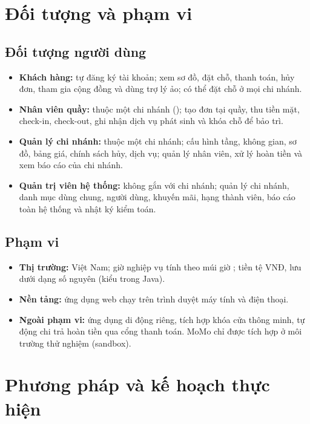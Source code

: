 \section{Đối tượng và phạm vi}
\label{sec:phamvi}

\subsection{Đối tượng người dùng}
\begin{itemize}
    \item \textbf{Khách hàng:} tự đăng ký tài khoản; xem sơ đồ, đặt chỗ, thanh toán, hủy đơn, tham gia cộng đồng và dùng trợ lý ảo; có thể đặt chỗ ở mọi chi nhánh.
    \item \textbf{Nhân viên quầy:} thuộc một chi nhánh (); tạo đơn tại quầy, thu tiền mặt, check-in, check-out, ghi nhận dịch vụ phát sinh và khóa chỗ để bảo trì.
    \item \textbf{Quản lý chi nhánh:} thuộc một chi nhánh; cấu hình tầng, không gian, sơ đồ, bảng giá, chính sách hủy, dịch vụ; quản lý nhân viên, xử lý hoàn tiền và xem báo cáo của chi nhánh.
    \item \textbf{Quản trị viên hệ thống:} không gắn với chi nhánh; quản lý chi nhánh, danh mục dùng chung, người dùng, khuyến mãi, hạng thành viên, báo cáo toàn hệ thống và nhật ký kiểm toán.
\end{itemize}

\subsection{Phạm vi}
\begin{itemize}
    \item \textbf{Thị trường:} Việt Nam; giờ nghiệp vụ tính theo múi giờ ; tiền tệ VNĐ, lưu dưới dạng số nguyên (kiểu  trong Java).
    \item \textbf{Nền tảng:} ứng dụng web chạy trên trình duyệt máy tính và điện thoại.
    \item \textbf{Ngoài phạm vi:} ứng dụng di động riêng, tích hợp khóa cửa thông minh, tự động chi trả hoàn tiền qua cổng thanh toán. MoMo chỉ được tích hợp ở môi trường thử nghiệm (sandbox).
\end{itemize}

\section{Phương pháp và kế hoạch thực hiện}
\label{sec:phuongphap}

